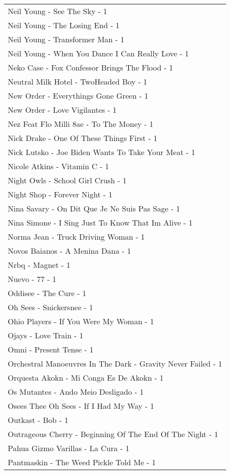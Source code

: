 \documentclass[
]{article}
\begin{document}
\begin{longtable}{l}
Neil Young - See The Sky - 1 \\ 
Neil Young - The Losing End - 1 \\ 
Neil Young - Transformer Man - 1 \\ 
Neil Young - When You Dance I Can Really Love - 1 \\ 
Neko Case - Fox Confessor Brings The Flood - 1 \\ 
Neutral Milk Hotel - TwoHeaded Boy - 1 \\ 
New Order - Everythings Gone Green - 1 \\ 
New Order - Love Vigilantes - 1 \\ 
Nez Feat Flo Milli 8ae - To The Money - 1 \\ 
Nick Drake - One Of These Things First - 1 \\ 
Nick Lutsko - Joe Biden Wants To Take Your Meat - 1 \\ 
Nicole Atkins - Vitamin C - 1 \\ 
Night Owls - School Girl Crush - 1 \\ 
Night Shop - Forever Night - 1 \\ 
Nina Savary - On Dit Que Je Ne Suis Pas Sage - 1 \\ 
Nina Simone - I Sing Just To Know That Im Alive - 1 \\ 
Norma Jean - Truck Driving Woman - 1 \\ 
Novos Baianos - A Menina Dana - 1 \\ 
Nrbq - Magnet - 1 \\ 
Nuevo - 77 - 1 \\ 
Oddisee - The Cure - 1 \\ 
Oh Sees - Snickersnee - 1 \\ 
Ohio Players - If You Were My Woman - 1 \\ 
Ojays - Love Train - 1 \\ 
Omni - Present Tense - 1 \\ 
Orchestral Manoeuvres In The Dark - Gravity Never Failed - 1 \\ 
Orquesta Akokn - Mi Conga Es De Akokn - 1 \\ 
Os Mutantes - Ando Meio Desligado - 1 \\ 
Osees Thee Oh Sees - If I Had My Way - 1 \\ 
Outkast - Bob - 1 \\ 
Outrageous Cherry - Beginning Of The End Of The Night - 1 \\ 
Pahua Gizmo Varillas - La Cura - 1 \\ 
Pantmaskin - The Weed Pickle Told Me - 1 \\ 

\end{longtable}
\end{document}
